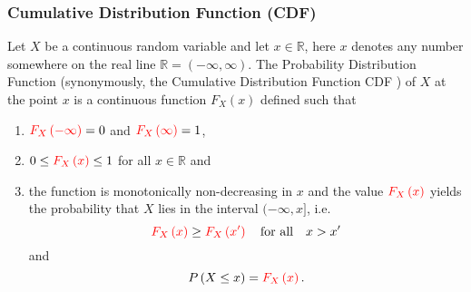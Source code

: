 \documentclass[notes=show,smaller,handout]{beamer}\usepackage[]{graphicx}\usepackage[]{color}
\renewcommand{\Pr}{P}
\newenvironment{stepenumerate}{\begin{enumerate}[<+->]}{\end{enumerate}}
\begin{document}
\begin{frame}%

\frametitle{Cumulative Distribution Function (CDF)}

\begin{definition}
 Let $X$ be a continuous random variable and let $x\in \mathbb{R}$, here $x$ denotes any number somewhere on the real line $\mathbb{R}=(-\infty,\infty)$. The Probability Distribution Function (synonymously, the Cumulative Distribution Function
\color{red}%
CDF%
\color{black}) of $X$ at the point $x$ is a continuous function
\color{red}%
$F_{X}\left( x\right) $
\color{black}
defined such that
\begin{stepenumerate} \vspace{0.3cm}
\item $\color{red}F_{X}\left( -\infty\right)\color{black}=0$ and $\color{red}F_{X}\left(\infty\right)\color{black}=1$,\vspace{0.3cm}
\item $0\leq \color{red}F_{X}\left( x\right)\color{black} \leq 1$ for all $x\in \mathbb{R}$ and\vspace{0.3cm}
\item the function is monotonically non-decreasing in $x$ and the value $\color{red}F_{X}\left( x\right)\color{black} $ yields the probability that $X$ lies in the interval $(-\infty,x]$, i.e.%
$$
\color{red} F_{X}\left( x\right)\color{black}\geq \color{red}F_{X}\left( x'\right)\color{black}\quad\mbox{for all}\quad x>x'
$$
and
$$
\Pr \left( X\leq x\right)=\color{red}F_{X}\left( x\right) \color{black}.
$$
\end{stepenumerate}
\end{definition}
\end{frame}%
\end{document}
